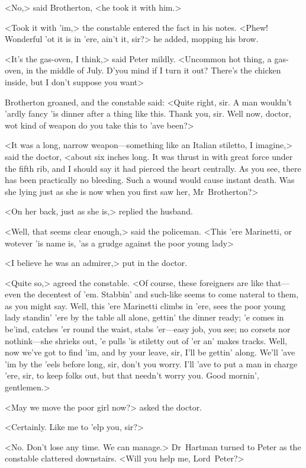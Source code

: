 <No,> said Brotherton, <he took it with him.>

<Took it with 'im,> the constable entered the fact in his notes. <Phew! Wonderful 'ot it is in 'ere, ain't it, sir?> he added, mopping his brow.

<It's the gas-oven, I think,> said Peter mildly. <Uncommon hot thing, a gas-oven, in the middle of July. D'you mind if I turn it out? There's the chicken inside, but I don't suppose you want\longdash>

Brotherton groaned, and the constable said: <Quite right, sir. A man wouldn't 'ardly fancy 'is dinner after a thing like this. Thank you, sir. Well now, doctor, wot kind of weapon do you take this to 'ave been?>

<It was a long, narrow weapon—something like an Italian stiletto, I imagine,> said the doctor, <about six inches long. It was thrust in with great force under the fifth rib, and I should say it had pierced the heart centrally. As you see, there has been practically no bleeding. Such a wound would cause instant death. Was she lying just as she is now when you first saw her, Mr~Brotherton?>

<On her back, just as she is,> replied the husband.

<Well, that seems clear enough,> said the policeman. <This 'ere Marinetti, or wotever 'is name is, 'as a grudge against the poor young lady\longdash>

<I believe he was an admirer,> put in the doctor.

<Quite so,> agreed the constable. <Of course, these foreigners are like that—even the decentest of 'em. Stabbin' and such-like seems to come nateral to them, as you might say. Well, this 'ere Marinetti climbs in 'ere, sees the poor young lady standin' 'ere by the table all alone, gettin' the dinner ready; 'e comes in be'ind, catches 'er round the waist, stabs 'er—easy job, you see; no corsets nor nothink—she shrieks out, 'e pulls 'is stiletty out of 'er an' makes tracks. Well, now we've got to find 'im, and by your leave, sir, I'll be gettin' along. We'll 'ave 'im by the 'eels before long, sir, don't you worry. I'll 'ave to put a man in charge 'ere, sir, to keep folks out, but that needn't worry you. Good mornin', gentlemen.>

<May we move the poor girl now?> asked the doctor.

<Certainly. Like me to 'elp you, sir?>

<No. Don't lose any time. We can manage.> Dr~Hartman turned to Peter as the constable clattered downstairs. <Will you help me, Lord~Peter?>

